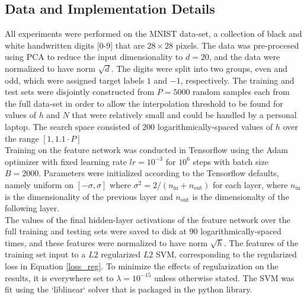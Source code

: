 \documentclass[11pt]{article}
\begin{document}


\subsection{Data and Implementation Details}

All experiments were performed on the MNIST data-set, a collection of black and white handwritten digits [0-9] that are $28\times28$ pixels. The data was pre-procesed using PCA to reduce the input dimensionality to $d=20$, and the data were normalized to have norm $\sqrt{d}$. The digits were split into two groups, even and odd, which were assigned target labels $1$ and $-1$, respectively. The training and test sets were disjointly constructed from $P=5000$ random samples each from the full data-set in order to allow the interpolation threshold to be found for values of $h$ and $N$ that were relatively small and could be handled by a personal laptop. The search space consisted of $200$ logarithmically-spaced values of $h$ over the range $[1, 1.1 \cdot P]$ \\

Training on the feature network was conducted in Tensorflow \cite{abadiTensorFlowLargeScaleMachine} using the Adam optimizer with fixed learning rate $lr=10^{-3}$ for $10^6$ steps with batch size $B = 2000$.  Parameters were initialized according to the Tensorflow defaults, namely uniform on $[-\sigma, \sigma]$ where $\sigma^2 = 2 /(n_\text{in} + n_\text{out})$ for each layer, where $n_\text{in}$ is the dimensionality of the previous layer and $n_\text{out}$ is the dimensionalty of the following layer.\\

The values of the final hidden-layer activations of the feature network over the full training and testing sets were saved to disk at $90$ logarithmically-spaced times, and these features were normalized to have norm $\sqrt{h}$. The features of the training set input to a $L2$ regularized $L2$ SVM, corresponding to the regularized loss in Equation \eqref{loss_reg}. To minimize the effects of regularization on the results, it is everywhere set to $\lambda = 10^{-15}$ unless otherwise stated. The SVM was fit using the `liblinear` \cite{fanLIBLINEARLibraryLarge} solver that is packaged in the 
\cite{pedregosaScikitlearnMachineLearning} python library.\\
\end{document}
